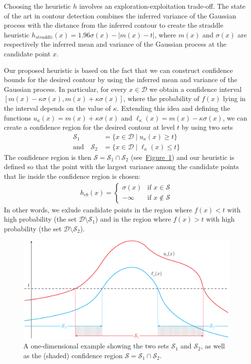 \documentclass[11pt]{article} %
\newcommand{\figref}[1]{\hyperref[#1]{\mbox{Figure~\ref*{#1}}}}
\newcommand{\twopartdef}[4]
{
	\left\{
		\begin{array}{ll}
			#1 & \mbox{if } #2 \\
			#3 & \mbox{if } #4
		\end{array}
	\right.
}
\begin{document}
Choosing the heuristic $h$ involves an exploration-exploitation trade-off. The
state of the art in contour detection combines the inferred variance of the
Gaussian process with the
distance from the inferred contour to create the straddle~\cite{bryan2005}
heuristic ${h_{straddle}(x) = 1.96\sigma(x) - | m(x) - t |}$, where $m(x)$
and $\sigma(x)$ are respectively the inferred mean and variance of the Gaussian
process at the candidate point $x$.

Our proposed heuristic is based on the fact that we can construct confidence
bounds for the desired contour by using the inferred mean and variance of
the Gaussian process. In particular, for every $x \in \mathcal{D}$ we obtain
a confidence interval ${[m(x) - \kappa\sigma(x), m(x) + \kappa\sigma(x)]}$,
where the probability of $f(x)$ lying in the interval depends on the value
of $\kappa$. Extending this idea and defining the functions
$u_{\kappa}(x) = m(x) + \kappa\sigma(x)$ and
$\ell_{\kappa}(x) = m(x) - \kappa\sigma(x)$,
we can create a confidence region for
the desired contour at level $t$ by using two sets
\begin{align*}
  \mathcal{S}_1 &= \{x \in \mathcal{D} \mid u_{\kappa}(x) \geq t\}\\
  \text{and}\hspace{1em}
  \mathcal{S}_2 &= \{x \in \mathcal{D} \mid \ell_{\kappa}(x) \leq t\}
\end{align*}
The confidence region is then
$\mathcal{S} = \mathcal{S}_1\cap\mathcal{S}_2$ (see~\figref{fig:cb}) and our
heuristic is defined
so that the point with the largest variance among the candidate points that
lie inside the confidence region is chosen:
\begin{align}\label{eq:hcb}
  h_{cb}(x) = \twopartdef { \sigma(x) } {x \in \mathcal{S}} {-\infty} {x \notin \mathcal{S}}
\end{align}
In other words, we exlude candidate points in the region where
$f(x) < t$ with high probability (the set $\mathcal{D}\setminus\mathcal{S}_1$)
and in the region where $f(x) > t$ with high probability
(the set $\mathcal{D}\setminus\mathcal{S}_2$).

\begin{figure}[tb]
  \centering
  \includegraphics[width=\textwidth]{figures/cb}
  \caption{A one-dimensional example showing the two sets $\mathcal{S}_1$ and
           $\mathcal{S}_2$, as well as the (shaded) confidence region
           $\mathcal{S} = \mathcal{S}_1\cap\mathcal{S}_2$.}
  \label{fig:cb}
  \vspace{-0.5em}
\end{figure}
\end{document}
